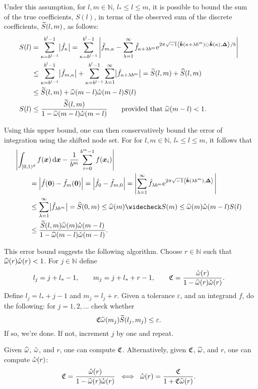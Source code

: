 \documentclass[graybox,footinfo]{svmult}
\newcommand{\N}{\mathbb{N}} %
\newcommand{\bszero}{\boldsymbol{0}} %
\newcommand{\bsx}{\boldsymbol{x}}    %
\newcommand{\bsDelta}{\boldsymbol{\Delta}}    %
\begin{document}
Under this assumption, for $l, m \in \N$, $l_* \le l \le m$, it is possible to bound the sum of the true coefficients, $S(l)$, in terms of the observed sum of the discrete coefficients, $\widetilde{S}(l,m)$, as follows:
\begin{align*}
S(l) &= \sum_{\kappa=b^{l-1}}^{b^{l}-1} \bigl \lvert \hf_{\kappa}\bigr\rvert= \sum_{\kappa=b^{l-1}}^{b^{l}-1} \abs{\tf_{m,\kappa} - \sum_{\lambda=1}^{\infty} \hf_{\kappa+\lambda b^{m}} \me^{2 \pi \sqrt{-1} \ip{\tvk(\kappa+\lambda b^{m}) \ominus \tvk(\kappa)}{\bsDelta}/b}}\\
&\le \sum_{\kappa=b^{l-1}}^{b^{l}-1} \bigl \lvert \tf_{m,\kappa} \bigr\rvert + \sum_{\kappa=b^{l-1}}^{b^{l}-1} \sum_{\lambda=1}^{\infty} \bigl \lvert \hf_{\kappa+\lambda b^{m}}\bigr\rvert = \tS(l,m) + \hS(l,m) \\
&\le \tS(l,m) + \homega(m-l) \wcomega(m-l) S(l) \\
S(l) & \le \frac{\tS(l,m)}{1 - \homega(m-l) \wcomega(m-l)} \qquad \text{provided that } \homega(m-l) < 1.
\end{align*}

Using this upper bound, one can then conservatively bound the error of integration using the shifted node set.  For for $l, m \in \N$, $l_* \le l \le m$, it follows that
\begin{align*}
\MoveEqLeft{\abs{\int_{\cube} f(\bsx) \, \dif \bsx - \frac{1}{b^m} \sum_{i=0}^{b^m-1} f(\bsx_i) }}\\
&= \abs{\hf(\bszero) - \tf_m(\bszero)} = \abs{\hf_0 - \tf_{m,0}} = \abs{\sum_{\lambda=1}^{\infty} \hf_{\lambda b^{m}} \me^{2 \pi \sqrt{-1}\ip{\tvk(\lambda b^{m})}{\bsDelta}}}\\
&\le \sum_{\lambda=1}^{\infty} \bigabs{\hf_{\lambda b^{m}}}
= \hS(0,m) \le \homega(m) \wcS(m) \le \homega(m) \wcomega(m-l) S(l) \\
& \le \frac{\tS(l,m)\homega(m) \wcomega(m-l)}{1 - \homega(m-l) \wcomega(m-l)}.
\end{align*}

This error bound suggests the following algorithm.  Choose $r \in \N$ such that $\widehat{\omega}(r)\mathring{\omega}(r)<1$.  For $j \in \N$ define
\[
l_j=j+l_*-1, \qquad  m_j=j+l_*+r-1, \qquad  \mathfrak{C} = \frac{\mathring{\omega}(r)}{1 - \widehat{\omega}(r)\mathring{\omega}(r)}.
\]
Define $l_j=l_*+j-1$ and $m_j=l_j+r$.  Given a tolerance $\varepsilon$, and an integrand $f$, do the following:  for $j=1, 2, \ldots$ check whether
\[
\mathfrak{C} \widehat{\omega}(m_j)  \widetilde{S}(l_j,m_j) \le \varepsilon.
\]
If so, we're done.  If not, increment $j$ by one and repeat.

Given $\widehat{\omega}$, $\mathring{\omega}$, and $r$, one can compute $\mathfrak{C}$.  Alternatively, given $\mathfrak{C}$, $\widehat{\omega}$, and $r$, one can compute $\mathring{\omega}(r)$:
\[
\mathfrak{C} = \frac{\mathring{\omega}(r)}{1 - \widehat{\omega}(r)\mathring{\omega}(r)} \ \iff \ \mathring{\omega}(r)= \frac{\mathfrak{C}}{1+\mathfrak{C}\widehat{\omega}(r)}.
\]
\end{document}
